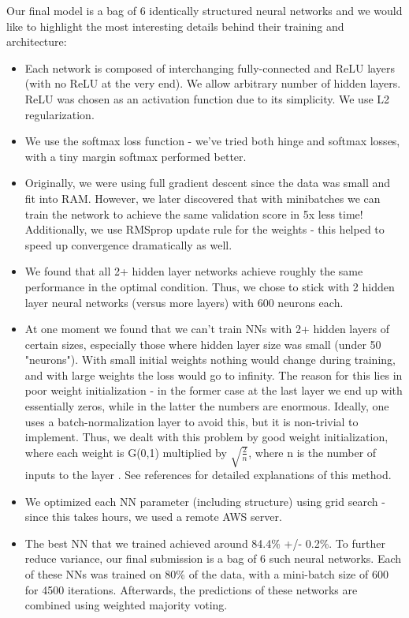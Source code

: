 \documentclass[10pt,conference,compsocconf]{IEEEtran}
\begin{document}
Our final model is a bag of 6 identically structured neural networks and we would like to highlight the most interesting details behind their training and architecture:
\begin{itemize}
\item Each network is composed of interchanging fully-connected and ReLU \cite{relu} layers (with no ReLU at the very end). We allow arbitrary number of hidden layers. ReLU was chosen as an activation function due to its simplicity. We use L2 regularization.
\item We use the softmax \cite{softmax} loss function - we've tried both hinge and softmax losses, with a tiny margin softmax performed better.
\item Originally, we were using full gradient descent since the data was small and fit into RAM. However, we later discovered that with minibatches we can train the network to achieve the same validation score in 5x less time! Additionally, we use RMSprop \cite{rmsprop} update rule for the weights - this helped to speed up convergence dramatically as well.
\item We found that all 2+ hidden layer networks achieve roughly the same performance in the optimal condition. Thus, we chose to stick with 2 hidden layer neural networks (versus more layers) with 600 neurons each.
\item At one moment we found that we can't train NNs with 2+ hidden layers of certain sizes, especially those where hidden layer size was small (under 50 "neurons"). With small initial weights nothing would change during training, and with large weights the loss would go to infinity. The reason for this lies in poor weight initialization - in the former case at the last layer we end up with essentially zeros, while in the latter the numbers are enormous. Ideally, one uses a batch-normalization layer to avoid this, but it is non-trivial to implement. Thus, we dealt with this problem by good weight initialization, where each weight is G(0,1) multiplied by $\sqrt{\frac{2}{n}}$, where n is the number of inputs to the layer \cite{calibratin_variance_blog} \cite{calibrating_variance_paper}. See references for detailed explanations of this method.
\item We optimized each NN parameter (including structure) using grid search - since this takes hours, we used a remote AWS server.
\item The best NN that we trained achieved around 84.4\% +/- 0.2\%. To further reduce variance, our final submission is a bag of 6 such neural networks. Each of these NNs was trained on 80\% of the data, with a mini-batch size of 600 for 4500 iterations. Afterwards, the predictions of these networks are combined using weighted majority voting.
\end{itemize}
\end{document}
